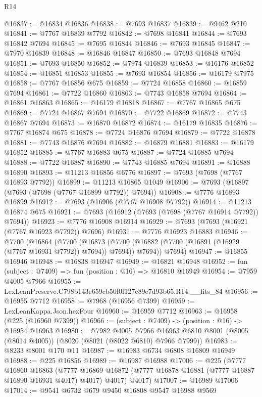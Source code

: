 \begin{lexlean}{R14}
\begin{coremodule}
@16837 := @16834 @16836
@16838 := @7693 @16837
@16839 := @9462 @210
@16841 := @7767 @16839 @7792
@16842 := @7698 @16841
@16844 := @7693 @16842 @7694
@16845 := @7695 @16844
@16846 := @7693 @16845
@16847 := @7970 @16839
@16848 := @16846 @16847
@16850 := @7693 @16848 @7694
@16851 := @7693 @16850
@16852 := @7974 @16839
@16853 := @16176 @16852
@16854 := @16851 @16853
@16855 := @7693 @16854
@16856 := @16179 @7975
@16858 := @7767 @16856 @675
@16859 := @7724 @16858
@16860 := @16859 @7694
@16861 := @7722 @16860
@16863 := @7743 @16858 @7694
@16864 := @16861 @16863
@16865 := @16179 @16818
@16867 := @7767 @16865 @675
@16869 := @7724 @16867 @7694
@16870 := @7722 @16869
@16872 := @7743 @16867 @7694
@16873 := @16870 @16872
@16874 := @16179 @16835
@16876 := @7767 @16874 @675
@16878 := @7724 @16876 @7694
@16879 := @7722 @16878
@16881 := @7743 @16876 @7694
@16882 := @16879 @16881
@16883 := @16179 @16852
@16885 := @7767 @16883 @675
@16887 := @7724 @16885 @7694
@16888 := @7722 @16887
@16890 := @7743 @16885 @7694
@16891 := @16888 @16890
@16893 := @11213 @16856 @6776
@16897 := @7693 (@7698 (@7767 @16893 @7792))
@16899 := @11213 @16865 @1049
@16906 := @7693 (@16897 (@7693 (@7698 (@7767 @16899 @7792)) @7694))
@16908 := @7776 @16893 @16899
@16912 := @7693 (@16906 (@7767 @16908 @7792))
@16914 := @11213 @16874 @675
@16921 := @7693 (@16912 (@7693 (@7698 (@7767 @16914 @7792)) @7694))
@16923 := @7776 @16908 @16914
@16929 := @7693 (@7693 (@16921 (@7767 @16923 @7792)) @7696)
@16931 := @7776 @16923 @16883
@16946 := @7700
    (@16864
      (@7700
        (@16873 (@7700 (@16882 (@7700 (@16891 (@16929 (@7767 @16931 @7792)) @7694)) @7694)) @7694))
      @7694)
@16947 := @16855 @16946
@16948 := @16838 @16947
@16949 := @16821 @16948
@16952 := fun (subject : @7409) => fun (position : @16) => @16810 @16949
@16954 := @7959 @4005 @7966
@16955 := LexLeanPreserve.C798b143e659cb50f0f127c89e7d93b65.R14.__fits_84
@16956 := @16955 @7712
@16958 := @7968 (@16956 @7399)
@16959 := LexLeanKappa.Json.hexFour
@16960 := @16959 @7712
@16963 := @16958 (@225 (@16960 @7399))
@16966 := (subject : @7409) -> (position : @16) -> @16954 @16963
@16980 := @7982
    @4005
    @7966
    @16963
    @6810
    @8001
    (@8005 (@8014 @4005))
    (@8020 (@8021 (@8022 @6810) @7966 @7999))
@16983 := @8233 @8001 @170 @11
@16987 := @16983 @6734 @6808 @16809 @16949
@16988 := @225 @16856
@16989 := @16987 @16988
@17006 := @225
    (@7777
      @16860
      @16863
      (@7777 @16869 @16872 (@7777 @16878 @16881 (@7777 @16887 @16890 @16931 @4017) @4017) @4017)
      @4017)
@17007 := @16989 @17006
@17014 := @9541 @6732 @679 @9450 @16808 @9547 @16988 @9569

\end{coremodule}
\end{lexlean}

